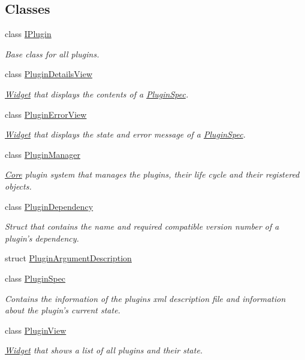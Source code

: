 \subsection*{Classes}
\begin{DoxyCompactItemize}
\item 
class \hyperlink{class_extension_system_1_1_i_plugin}{I\-Plugin}
\begin{DoxyCompactList}\small\item\em Base class for all plugins. \end{DoxyCompactList}\item 
class \hyperlink{class_extension_system_1_1_plugin_details_view}{Plugin\-Details\-View}
\begin{DoxyCompactList}\small\item\em \hyperlink{class_widget}{Widget} that displays the contents of a \hyperlink{class_extension_system_1_1_plugin_spec}{Plugin\-Spec}. \end{DoxyCompactList}\item 
class \hyperlink{class_extension_system_1_1_plugin_error_view}{Plugin\-Error\-View}
\begin{DoxyCompactList}\small\item\em \hyperlink{class_widget}{Widget} that displays the state and error message of a \hyperlink{class_extension_system_1_1_plugin_spec}{Plugin\-Spec}. \end{DoxyCompactList}\item 
class \hyperlink{class_extension_system_1_1_plugin_manager}{Plugin\-Manager}
\begin{DoxyCompactList}\small\item\em \hyperlink{namespace_core}{Core} plugin system that manages the plugins, their life cycle and their registered objects. \end{DoxyCompactList}\item 
class \hyperlink{struct_extension_system_1_1_plugin_dependency}{Plugin\-Dependency}
\begin{DoxyCompactList}\small\item\em Struct that contains the name and required compatible version number of a plugin's dependency. \end{DoxyCompactList}\item 
struct \hyperlink{struct_extension_system_1_1_plugin_argument_description}{Plugin\-Argument\-Description}
\item 
class \hyperlink{class_extension_system_1_1_plugin_spec}{Plugin\-Spec}
\begin{DoxyCompactList}\small\item\em Contains the information of the plugins xml description file and information about the plugin's current state. \end{DoxyCompactList}\item 
class \hyperlink{class_extension_system_1_1_plugin_view}{Plugin\-View}
\begin{DoxyCompactList}\small\item\em \hyperlink{class_widget}{Widget} that shows a list of all plugins and their state. \end{DoxyCompactList}\end{DoxyCompactItemize}


